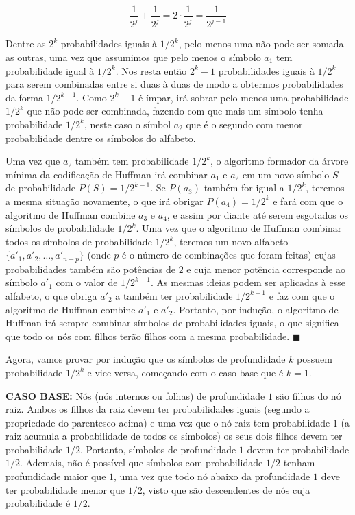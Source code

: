 \documentclass[12pt, a4paper]{article}
\begin{document}
\[ \frac{1}{2^j} + \frac{1}{2^j} = 2 \cdot \frac{1}{2^j} = \frac{1}{2^{j-1}} \]

Dentre as $2^k$ probabilidades iguais à $1/2^k$, pelo menos uma não pode ser somada as outras, uma vez que assumimos que pelo menos o símbolo $a_1$ tem probabilidade igual à $1/2^k$. Nos resta então $2^k - 1$ probabilidades iguais à $1/2^k$ para serem combinadas entre si duas à duas de modo a obtermos probabilidades da forma $1/2^{k-1}$. Como $2^k - 1$ é ímpar, irá sobrar pelo menos uma probabilidade $1/2^k$ que não pode ser combinada, fazendo com que mais um símbolo tenha probabilidade $1/2^k$, neste caso o símbol $a_2$ que é o segundo com menor probabilidade dentre os símbolos do alfabeto.

Uma vez que $a_2$ também tem probabilidade $1/2^k$, o algoritmo formador da árvore mínima da codificação de Huffman irá combinar $a_1$ e $a_2$ em um novo símbolo $S$ de probabilidade $P(S)=1/2^{k-1}$. Se $P(a_3)$ também for igual a $1/2^k$, teremos a mesma situação novamente, o que irá obrigar $P(a_4)=1/2^k$ e fará com que o algoritmo de Huffman combine $a_3$ e $a_4$, e assim por diante até serem esgotados os símbolos de probabilidade $1/2^k$. Uma vez que o algoritmo de Huffman combinar todos os símbolos de probabilidade $1/2^k$, teremos um novo alfabeto $\{ a'_1, a'_2, \ldots, a'_{n-p} \}$ (onde $p$ é o número de combinações que foram feitas) cujas probabilidades também são potências de $2$ e cuja menor potência corresponde ao símbolo $a'_1$ com o valor de $1/2^{k-1}$. As mesmas ideias podem ser aplicadas à esse alfabeto, o que obriga $a'_2$ a também ter probabilidade $1/2^{k-1}$ e faz com que o algoritmo de Huffman combine $a'_1$ e $a'_2$. Portanto, por indução, o algoritmo de Huffman irá sempre combinar símbolos de probabilidades iguais, o que significa que todo os nós com filhos terão filhos com a mesma probabilidade. $\blacksquare$

Agora, vamos provar por indução que os símbolos de profundidade $k$ possuem probabilidade $1/2^k$ e vice-versa, começando com o caso base que é $k=1$.

\textbf{CASO BASE:} Nós (nós internos ou folhas) de profundidade $1$ são filhos do nó raiz. Ambos os filhos da raiz devem ter probabilidades iguais (segundo a propriedade do parentesco acima) e uma vez que o nó raiz tem probabilidade $1$ (a raiz acumula a probabilidade de todos os símbolos) os seus dois filhos devem ter probabilidade $1/2$. Portanto, símbolos de profundidade $1$ devem ter probabilidade $1/2$. Ademais, não é possível que símbolos com probabilidade $1/2$ tenham profundidade maior que $1$, uma vez que todo nó abaixo da profundidade $1$ deve ter probabilidade menor que $1/2$, visto que são descendentes de nós cuja probabilidade é $1/2$.
\end{document}
